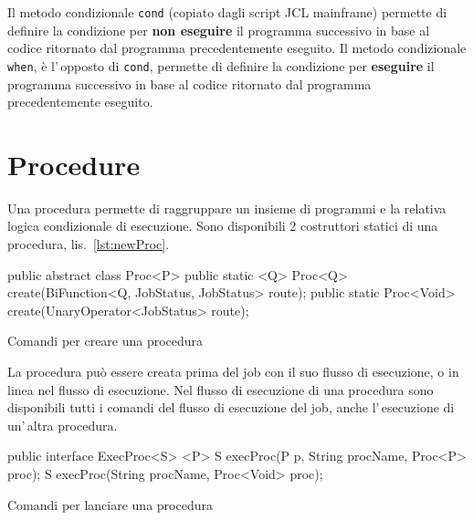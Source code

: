 Il metodo condizionale \texttt{cond} (copiato dagli script JCL mainframe)
permette di definire la condizione per \textbf{non eseguire} il programma
successivo in base al codice ritornato dal programma precedentemente eseguito.
Il metodo condizionale \texttt{when}, è l'\,opposto di \texttt{cond}, permette
di definire la condizione per \textbf{eseguire} il programma successivo in base
al codice ritornato dal programma precedentemente eseguito.


\section{Procedure} \label{sec:proc}
Una procedura permette di raggruppare un insieme di programmi e la relativa
logica condizionale di esecuzione.
Sono disponibili 2 costruttori statici di una procedura, lis.~\ref{lst:newProc}.

\begin{elisting}[!htb]
    \begin{javacode}
        public abstract class Proc<P> {
    public static <Q> Proc<Q> create(BiFunction<Q, JobStatus, JobStatus> route);
    public static Proc<Void> create(UnaryOperator<JobStatus> route);
}
    \end{javacode}
    \caption{Comandi per creare una procedura}
    \label{lst:newProc}
\end{elisting}

La procedura può essere creata prima del job con il suo flusso di esecuzione, o
in linea nel flusso di esecuzione.
Nel flusso di esecuzione di una procedura sono disponibili tutti i comandi del
flusso di esecuzione del job, anche l'\,esecuzione di un'\,altra procedura.

\begin{elisting}[!htb]
    \begin{javacode}
        public interface ExecProc<S> {
    <P> S execProc(P p, String procName, Proc<P> proc);
    S execProc(String procName, Proc<Void> proc);
}
    \end{javacode}
    \caption{Comandi per lanciare una procedura}
    \label{lst:runProc}
\end{elisting}

